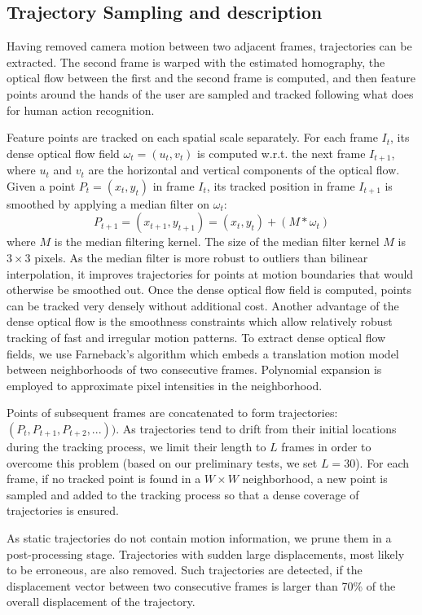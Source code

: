 \subsection{Trajectory Sampling and description}
Having removed camera motion between two adjacent frames, trajectories can be extracted. The second frame is warped with the estimated homography, the optical flow between the first and the second frame is computed, and then feature points around the hands of the user are sampled and tracked following what \cite{wang:2011:inria-00583818:1} does for human action recognition.

Feature points are tracked on each spatial scale separately. For each frame $I_t$, its dense optical flow field
$\omega_t = (u_t, v_t)$ is computed w.r.t. the next frame $I_{t+1}$, where $u_t$ and $v_t$ are the horizontal and vertical
components of the optical flow. Given a point $P_t = (x_t, y_t)$ in frame $I_t$, its tracked position in frame $I_{t+1}$
is smoothed by applying a median filter on $\omega_t$:
\begin{equation}
P_{t+1} = (x_{t+1}, y_{t+1}) = (x_t, y_t) + (M * \omega_t)
\end{equation}
where $M$ is the median filtering kernel. The size of the median filter kernel $M$ is $3 \times 3$ pixels. As the
median filter is more robust to outliers than bilinear interpolation, it improves trajectories
for points at motion boundaries that would otherwise be smoothed out.
Once the dense optical flow field is computed, points can be tracked very densely without additional
cost. Another advantage of the dense optical flow is the smoothness constraints which allow relatively
robust tracking of fast and irregular motion patterns. To extract dense optical flow fields, we
use Farneback's algorithm \cite{farneback2003two} which embeds a translation motion model between neighborhoods of two consecutive
frames. Polynomial expansion is employed to approximate pixel intensities in the neighborhood.

Points of subsequent frames are concatenated to form trajectories: $(P_t,  P_{t+1}, P_{t+2}, ...))$. As trajectories
tend to drift from their initial locations during the tracking process, we limit their length to $L$ frames
in order to overcome this problem (based on our preliminary tests, we set $L=30$). For each frame, if no tracked point is found
in a $W \times W$ neighborhood, a new point is sampled and added to the tracking process so that a dense coverage
of trajectories is ensured.

As static trajectories do not contain motion information, we prune them in a post-processing stage.
Trajectories with sudden large displacements, most likely to be erroneous, are also removed. Such trajectories
are detected, if the displacement vector between two consecutive frames is larger than 70\% of the
overall displacement of the trajectory.

